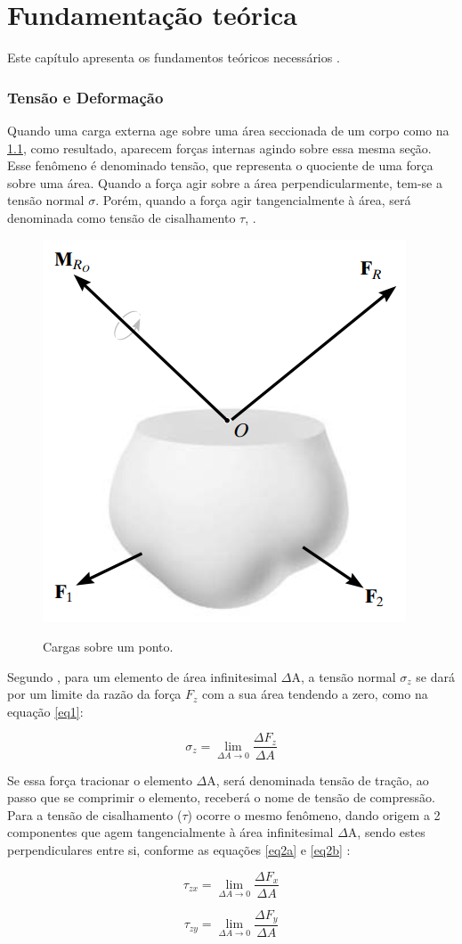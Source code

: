 \chapter{Fundamentação teórica} \label{RevisaoBibliografica}

Este capítulo apresenta os fundamentos teóricos necessários .

\subsection{Tensão e Deformação}

Quando uma carga externa age sobre uma área seccionada de um corpo como na  \ref{pontoesp}, como resultado, aparecem forças internas agindo sobre essa mesma seção. Esse fenômeno é denominado tensão, que representa o quociente de uma força sobre uma área. Quando a força agir sobre a área perpendicularmente, tem-se a tensão normal \(\sigma \). Porém, quando a força agir tangencialmente à área, será denominada como tensão de cisalhamento \(\tau \), \cite{Hibbeler2009}.

\begin{figure}[!htb]
   \centering
     \caption{Cargas sobre um ponto.}
    \includegraphics[width=0.3\linewidth]{Figuras/pontoespecifico.png}\\
    \hspace{1.5cm}\raggedright \fontsize{10}{12}
    \label{pontoesp}
\end{figure}

Segundo \textcite{Hibbeler2009}, para um elemento de área infinitesimal \(\Delta \)A, a tensão normal \( \sigma_z \) se dará por um limite da razão da força \( F_z \) com a sua área tendendo a zero, como na equação \ref{eq1}:

\begin{equation}
\label{eq1}
\sigma_z =  \lim_{\Delta A\to0} \frac{\Delta F_z}{\Delta A} 
\end{equation}
\bigskip

Se essa força tracionar o elemento \(\Delta \)A, será denominada tensão de tração, ao passo que se comprimir o elemento, receberá o nome de tensão de compressão.
Para a tensão de cisalhamento (\(\tau \)) ocorre o mesmo fenômeno, dando origem a 2 componentes que agem tangencialmente à área infinitesimal \(\Delta \)A, sendo estes perpendiculares entre si, conforme as equações \ref{eq2a} e \ref{eq2b} \cite{Hibbeler2009}:

\begin{equation}
\label{eq2a}
\tau_{zx} =  \lim_{\Delta A\to0} \frac{\Delta F_x}{\Delta A}
\end{equation}
\bigskip

\begin{equation}
\label{eq2b}
\tau_{zy} =  \lim_{\Delta A\to0} \frac{\Delta F_y}{\Delta A}
\end{equation}
\bigskip

